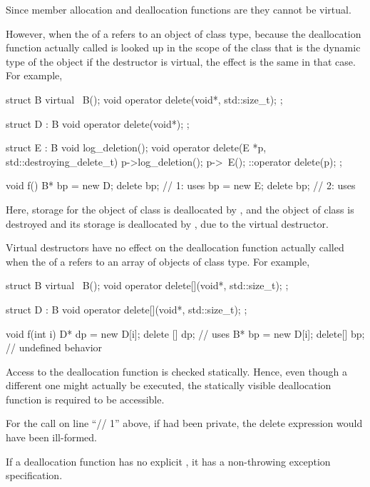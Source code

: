 \pnum
Since member allocation and deallocation functions are
they cannot be virtual.
\begin{note}
However, when the
of a
refers to an object of class type,
because the deallocation function actually called is looked up in the scope of
the class that is the dynamic type of the object
if the destructor is virtual, the effect is the same in that case.
For example,
\begin{codeblock}
struct B {
  virtual ~B();
  void operator delete(void*, std::size_t);
};

struct D : B {
  void operator delete(void*);
};

struct E : B {
  void log_deletion();
  void operator delete(E *p, std::destroying_delete_t) {
    p->log_deletion();
    p->~E();
    ::operator delete(p);
  }
};

void f() {
  B* bp = new D;
  delete bp;        // 1: uses 
  bp = new E;
  delete bp;        // 2: uses 
}
\end{codeblock}
Here, storage for the object of class
is deallocated by
,
and
the object of class  is destroyed
and its storage is deallocated
by ,
due to the virtual destructor.
\end{note}
\begin{note}
Virtual destructors have no effect on the deallocation function actually
called when the
of a
refers to an array of objects of class type.
For example,
\begin{codeblock}
struct B {
  virtual ~B();
  void operator delete[](void*, std::size_t);
};

struct D : B {
  void operator delete[](void*, std::size_t);
};

void f(int i) {
  D* dp = new D[i];
  delete [] dp;     // uses 
  B* bp = new D[i];
  delete[] bp;      // undefined behavior
}
\end{codeblock}
\end{note}

\pnum
Access to the deallocation function is checked statically.
Hence, even though a different one might actually be executed,
the statically visible deallocation function is required to be accessible.
\begin{example}
For the call on line ``// 1'' above,
if
had been private, the delete expression would have been ill-formed.
\end{example}

\pnum
\begin{note}
If a deallocation function has no explicit , it
has a non-throwing exception specification.
\end{note}

